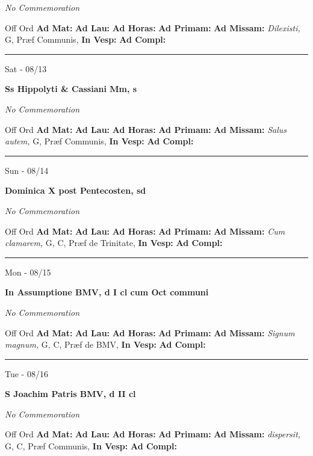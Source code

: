 \documentclass[letterpaper, 10pt]{article}
\begin{document}
\textit{No Commemoration}\begin{justify}
Off Ord
\textbf{Ad Mat: }
\textbf{Ad Lau: }
\textbf{Ad Horas: }
\textbf{Ad Primam: }
\textbf{Ad Missam:} \textit{Dilexisti, } G, Præf Communis, 
\textbf{In Vesp: }
\textbf{Ad Compl: }\end{justify}



\hrule
\begin{center}
Sat - 08/13
\end{center}\textbf{ \large Ss Hippolyti \& Cassiani Mm, \textnormal{\normalsize s}}

\textit{No Commemoration}\begin{justify}
Off Ord
\textbf{Ad Mat: }
\textbf{Ad Lau: }
\textbf{Ad Horas: }
\textbf{Ad Primam: }
\textbf{Ad Missam:} \textit{Salus autem, } G, Præf Communis, 
\textbf{In Vesp: }
\textbf{Ad Compl: }\end{justify}



\hrule
\begin{center}
Sun - 08/14
\end{center}\textbf{ \large Dominica X post Pentecosten, \textnormal{\normalsize sd}}

\textit{No Commemoration}\begin{justify}
Off Ord
\textbf{Ad Mat: }
\textbf{Ad Lau: }
\textbf{Ad Horas: }
\textbf{Ad Primam: }
\textbf{Ad Missam:} \textit{Cum clamarem, } G, C, Præf de Trinitate, 
\textbf{In Vesp: }
\textbf{Ad Compl: }\end{justify}



\hrule
\begin{center}
Mon - 08/15
\end{center}\textbf{ \large In Assumptione BMV, \textnormal{\normalsize d I cl cum Oct communi}}

\textit{No Commemoration}\begin{justify}
Off Ord
\textbf{Ad Mat: }
\textbf{Ad Lau: }
\textbf{Ad Horas: }
\textbf{Ad Primam: }
\textbf{Ad Missam:} \textit{Signum magnum, } G, C, Præf de BMV, 
\textbf{In Vesp: }
\textbf{Ad Compl: }\end{justify}



\hrule
\begin{center}
Tue - 08/16
\end{center}\textbf{ \large S Joachim Patris BMV, \textnormal{\normalsize d II cl}}

\textit{No Commemoration}\begin{justify}
Off Ord
\textbf{Ad Mat: }
\textbf{Ad Lau: }
\textbf{Ad Horas: }
\textbf{Ad Primam: }
\textbf{Ad Missam:} \textit{dispersit, } G, C, Præf Communis, 
\textbf{In Vesp: }
\textbf{Ad Compl: }\end{justify}
\end{document}
